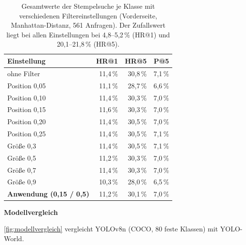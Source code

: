 \begin{table}[H]
\centering
\small
\caption{Gesamtwerte der Stempelsuche je Klasse mit verschiedenen Filtereinstellungen (Vorderseite, Manhattan-Distanz, 561 Anfragen). Der Zufallswert liegt bei allen Einstellungen bei 4,8--5,2\,\% (HR@1) und 20,1--21,8\,\% (HR@5).}
\label{tab:filter}
\begin{tabular}{|l|r|r|r|}
\hline
\textbf{Einstellung} & \textbf{HR@1} & \textbf{HR@5} & \textbf{P@5} \\ \hline
ohne Filter                          & 11{,}4\,\% & 30{,}8\,\% & 7{,}1\,\% \\ \hline
Position 0{,}05                      & 11{,}1\,\% & 28{,}7\,\% & 6{,}6\,\% \\ \hline
Position 0{,}10                      & 11{,}4\,\% & 30{,}3\,\% & 7{,}0\,\% \\ \hline
Position 0{,}15                      & 11{,}6\,\% & 30{,}3\,\% & 7{,}0\,\% \\ \hline
Position 0{,}20                      & 11{,}4\,\% & 30{,}5\,\% & 7{,}0\,\% \\ \hline
Position 0{,}25                      & 11{,}4\,\% & 30{,}5\,\% & 7{,}1\,\% \\ \hline
Größe 0{,}3                          & 11{,}4\,\% & 30{,}5\,\% & 7{,}1\,\% \\ \hline
Größe 0{,}5                          & 11{,}2\,\% & 30{,}3\,\% & 7{,}0\,\% \\ \hline
Größe 0{,}7                          & 11{,}4\,\% & 30{,}3\,\% & 7{,}0\,\% \\ \hline
Größe 0{,}9                          & 10{,}3\,\% & 28{,}0\,\% & 6{,}5\,\% \\ \hline
\textbf{Anwendung (0{,}15 / 0{,}5)}  & 11{,}2\,\% & 30{,}1\,\% & 7{,}0\,\% \\ \hline
\end{tabular}
\end{table}

\vspace{\baselineskip}

\noindent \textbf{Modellvergleich}

\noindent \cref{fig:modellvergleich} vergleicht YOLOv8n (COCO, 80 feste Klassen) mit YOLO-World. 



